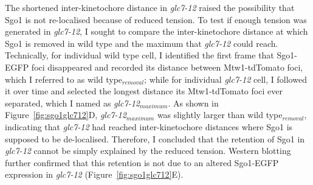 The shortened inter-kinetochore distance in \textit{glc7-12} raised the possibility that Sgo1 is not re-localised because of reduced tension. To test if enough tension was generated in \textit{glc7-12}, I sought to compare the inter-kinetochore distance at which Sgo1 is removed in wild type and the maximum that \textit{glc7-12} could reach. Technically, for individual wild type cell, I identified the first frame that Sgo1-EGFP foci disappeared and recorded its distance between Mtw1-tdTomato foci, which I referred to as wild type$_{removal}$; while for individual \textit{glc7-12} cell, I followed it over time and selected the longest distance its Mtw1-tdTomato foci ever separated, which I named as \textit{glc7-12}$_{maximum}$. As shown in Figure~\ref{fig:sgo1glc712}D, \textit{glc7-12}$_{maximum}$ was slightly larger than wild type$_{removal}$, indicating that \textit{glc7-12} had reached inter-kinetochore distances where Sgo1 is supposed to be de-localised. Therefore, I concluded that the retention of Sgo1 in \textit{glc7-12} cannot be simply explained by the reduced tension. Western blotting further confirmed that this retention is not due to an altered Sgo1-EGFP expression in \textit{glc7-12} (Figure~\ref{fig:sgo1glc712}E). 

